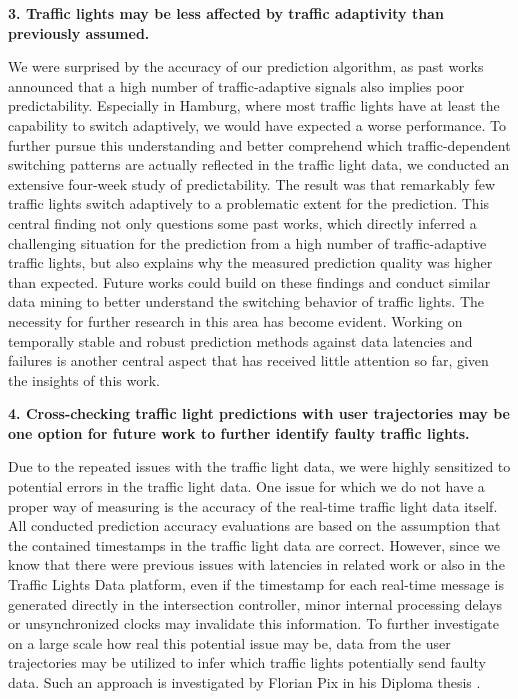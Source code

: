 \textbf{\color{cidarkblue}3. Traffic lights may be less affected by traffic adaptivity than previously assumed.} 

We were surprised by the accuracy of our prediction algorithm, as past works announced that a high number of traffic-adaptive signals also implies poor predictability. Especially in Hamburg, where most traffic lights have at least the capability to switch adaptively, we would have expected a worse performance. To further pursue this understanding and better comprehend which traffic-dependent switching patterns are actually reflected in the traffic light data, we conducted an extensive four-week study of predictability. The result was that remarkably few traffic lights switch adaptively to a problematic extent for the prediction. This central finding not only questions some past works, which directly inferred a challenging situation for the prediction from a high number of traffic-adaptive traffic lights, but also explains why the measured prediction quality was higher than expected. Future works could build on these findings and conduct similar data mining to better understand the switching behavior of traffic lights. The necessity for further research in this area has become evident. Working on temporally stable and robust prediction methods against data latencies and failures is another central aspect that has received little attention so far, given the insights of this work.

\textbf{\color{cidarkblue}4. Cross-checking traffic light predictions with user trajectories may be one option for future work to further identify faulty traffic lights.} 

Due to the repeated issues with the traffic light data, we were highly sensitized to potential errors in the traffic light data. One issue for which we do not have a proper way of measuring is the accuracy of the real-time traffic light data itself. All conducted prediction accuracy evaluations are based on the assumption that the contained timestamps in the traffic light data are correct. However, since we know that there were previous issues with latencies in related work or also in the Traffic Lights Data platform, even if the timestamp for each real-time message is generated directly in the intersection controller, minor internal processing delays or unsynchronized clocks may invalidate this information. To further investigate on a large scale how real this potential issue may be, data from the user trajectories may be utilized to infer which traffic lights potentially send faulty data. Such an approach is investigated by Florian Pix in his Diploma thesis \cite{pix_2024}.

